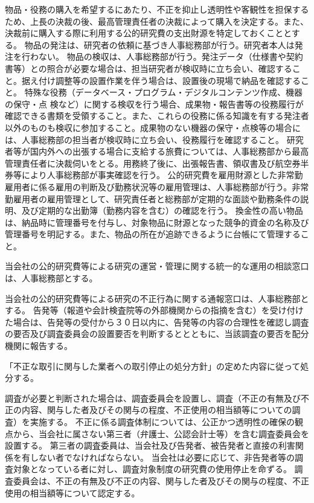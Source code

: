 \documentclass[10pt,a4paper,uplatex]{jsarticle}
\begin{document}
物品・役務の購入を希望するにあたり、不正を抑止し透明性や客観性を担保するため、上長の決裁の後、最高管理責任者の決裁によって購入を決定する。また、決裁前に購入する際に利用する公的研究費の支出財源を特定しておくこととする。
\term 物品の発注は、研究者の依頼に基づき人事総務部が行う。研究者本人は発注を行わない。 
\term 物品の検収は、人事総務部が行う。発注データ（仕様書や契約書等）との照合が必要な場合は、担当研究者が検収時に立ち会い、確認すること。据え付け調整等の設置作業を伴う場合は、設置後の現場で納品を確認すること。
\term 特殊な役務（データベース・プログラム・デジタルコンテンツ作成、機器の保守・点
検など）に関する検収を行う場合、成果物・報告書等の役務履行が確認できる書類を受領すること。また、これらの役務に係る知識を有する発注者以外のものも検収に参加すること。成果物のない機器の保守・点検等の場合には、人事総務部の担当者が検収時に立ち会い、役務履行を確認すること。
\term 研究者等が国内外への出張する場合に支給する旅費については、人事総務部から最高管理責任者に決裁伺いをとる。用務終了後に、出張報告書、領収書及び航空券半券等により人事総務部が事実確認を行う。
\term 公的研究費を雇用財源とした非常勤雇用者に係る雇用の判断及び勤務状況等の雇用管理は、人事総務部が行う。非常勤雇用者の雇用管理として、研究責任者と総務部が定期的な面談や勤務条件の説明、及び定期的な出勤簿（勤務内容を含む）の確認を行う。
\term 換金性の高い物品は、納品時に管理番号を付与し、対象物品に財源となった競争的資金の名称及び管理番号を明記する。また、物品の所在が追跡できるように台帳にて管理すること。

当会社の公的研究費等による研究の運営・管理に関する統一的な運用の相談窓口は、人事総務部とする。

当会社の公的研究費等による研究の不正行為に関する通報窓口は、人事総務部とする。
\term 告発等（報道や会計検査院等の外部機関からの指摘を含む）を受け付けた場合は、告発等の受付から３０日以内に、告発等の内容の合理性を確認し調査の要否及び調査委員会の設置要否を判断するととともに、当該調査の要否を配分機関に報告する。

「不正な取引に関与した業者への取引停止の処分方針」の定めた内容に従って処分する。

調査が必要と判断された場合は、調査委員会を設置し、調査（不正の有無及び不正の内容、関与した者及びその関与の程度、不正使用の相当額等についての調査）を実施する。
\term 不正に係る調査体制については、公正かつ透明性の確保の観点から、当会社に属さない第三者（弁護士、公認会計士等）を含む調査委員会を設置する。
\term 第三者の調査委員は、当会社及び告発者、被告発者と直接の利害関係を有しない者でなければならない。
\term 当会社は必要に応じて、非告発者等の調査対象となっている者に対し、調査対象制度の研究費の使用停止を命ずる。
\term 調査委員会は、不正の有無及び不正の内容、関与した者及びその関与の程度、不正使用の相当額等について認定する。
\end{document}
